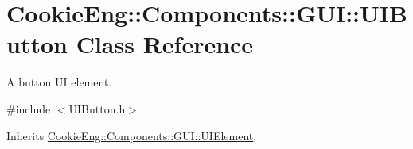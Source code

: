 \hypertarget{class_cookie_eng_1_1_components_1_1_g_u_i_1_1_u_i_button}{}\section{Cookie\+Eng\+:\+:Components\+:\+:G\+UI\+:\+:U\+I\+Button Class Reference}
\label{class_cookie_eng_1_1_components_1_1_g_u_i_1_1_u_i_button}


A button UI element.  




{\ttfamily \#include $<$U\+I\+Button.\+h$>$}



Inherits \hyperlink{class_cookie_eng_1_1_components_1_1_g_u_i_1_1_u_i_element}{Cookie\+Eng\+::\+Components\+::\+G\+U\+I\+::\+U\+I\+Element}.

